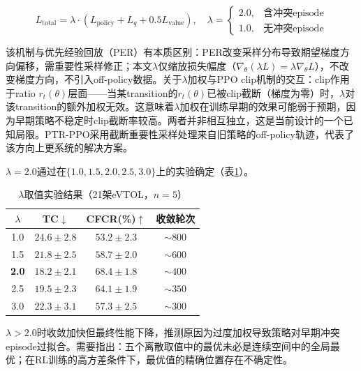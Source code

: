 \documentclass[12pt,a4paper,UTF8]{ctexart}
\begin{document}
\begin{equation}
    L_{\text{total}} = \lambda \cdot (L_{\text{policy}} + L_q + 0.5L_{\text{value}}),\quad
    \lambda = \begin{cases}
        2.0, & \text{含冲突episode} \\
        1.0, & \text{无冲突episode}
    \end{cases}
\end{equation}

该机制与优先经验回放（PER）有本质区别：PER改变采样分布导致期望梯度方向偏移，需重要性采样修正；本文$\lambda$仅缩放损失幅度（$\nabla_\theta(\lambda L) = \lambda \nabla_\theta L$），不改变梯度方向，不引入off-policy数据。关于$\lambda$加权与PPO clip机制的交互：clip作用于ratio $r_t(\theta)$层面——当某transition的$r_t(\theta)$已被clip截断（梯度为零）时，$\lambda$对该transition的额外加权无效。这意味着$\lambda$加权在训练早期的效果可能弱于预期，因为早期策略不稳定时clip截断率较高。两者并非相互独立，这是当前设计的一个已知局限。PTR-PPO\cite{ref27}采用截断重要性采样处理来自旧策略的off-policy轨迹，代表了该方向上更系统的解决方案。

$\lambda=2.0$通过在$\{1.0, 1.5, 2.0, 2.5, 3.0\}$上的实验确定（表\ref{tab:lambda}）。

\begin{table}[H]
    \centering
    \caption{$\lambda$取值实验结果（21架eVTOL，$n=5$）}
    \label{tab:lambda}
    \begin{tabular}{|c|c|c|c|}
        \hline
        $\lambda$ & TC$\downarrow$ & CFCR(\%)$\uparrow$ & 收敛轮次 \\
        \hline
        1.0 & $24.6 \pm 2.8$ & $53.2 \pm 2.3$ & $\sim800$ \\
        1.5 & $21.8 \pm 2.5$ & $58.7 \pm 2.0$ & $\sim600$ \\
        \textbf{2.0} & $\mathbf{18.2 \pm 2.1}$ & $\mathbf{68.4 \pm 1.8}$ & $\sim400$ \\
        2.5 & $19.5 \pm 2.3$ & $64.1 \pm 1.9$ & $\sim350$ \\
        3.0 & $22.3 \pm 3.1$ & $57.3 \pm 2.5$ & $\sim300$ \\
        \hline
    \end{tabular}
\end{table}

$\lambda > 2.0$时收敛加快但最终性能下降，推测原因为过度加权导致策略对早期冲突episode过拟合。需要指出：五个离散取值中的最优未必是连续空间中的全局最优；在RL训练的高方差条件下，最优值的精确位置存在不确定性。

\end{document}

